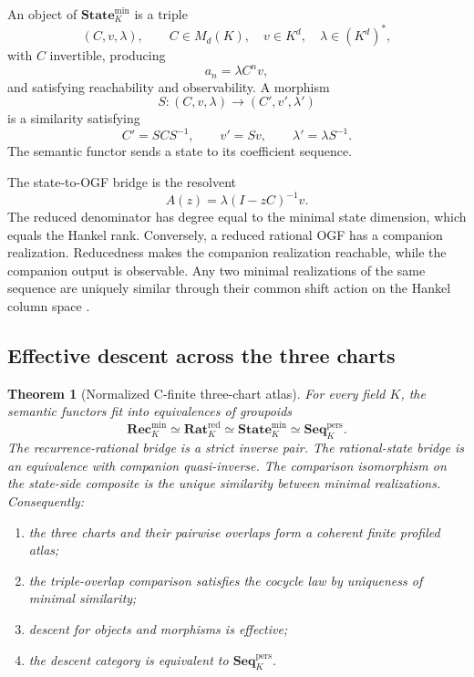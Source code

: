 \documentclass[11pt]{article}
\newtheorem{theorem}{Theorem}[section]
\theoremstyle{definition}
\theoremstyle{remark}
\newcommand{\Seq}{\mathbf{Seq}}
\newcommand{\Rat}{\mathbf{Rat}}
\newcommand{\Rec}{\mathbf{Rec}}
\newcommand{\State}{\mathbf{State}}
\begin{document}
An object of \(\State_K^{\mathrm{min}}\) is a triple
\[
(C,v,\lambda),
\qquad
C\in M_d(K),\quad v\in K^d,\quad \lambda\in(K^d)^*,
\]
with \(C\) invertible, producing
\[
a_n=\lambda C^nv,
\]
and satisfying reachability and observability. A morphism
\[
S:(C,v,\lambda)\longrightarrow(C',v',\lambda')
\]
is a similarity satisfying
\[
C'=SCS^{-1},
\qquad
v'=Sv,
\qquad
\lambda'=\lambda S^{-1}.
\]
The semantic functor sends a state to its coefficient sequence.

The state-to-OGF bridge is the resolvent
\[
A(z)=\lambda(I-zC)^{-1}v.
\]
The reduced denominator has degree equal to the minimal state dimension, which equals the Hankel rank. Conversely, a reduced rational OGF has a companion realization. Reducedness makes the companion realization reachable, while the companion output is observable. Any two minimal realizations of the same sequence are uniquely similar through their common shift action on the Hankel column space \cite{SEQ}.

\subsection{Effective descent across the three charts}

\begin{theorem}[Normalized C-finite three-chart atlas]
\label{thm:cfinite-three-chart}
For every field \(K\), the semantic functors fit into equivalences of groupoids
\[
\Rec_K^{\mathrm{min}}
\simeq
\Rat_K^{\mathrm{red}}
\simeq
\State_K^{\mathrm{min}}
\simeq
\Seq_K^{\mathrm{pers}}.
\]
The recurrence-rational bridge is a strict inverse pair. The rational-state bridge is an equivalence with companion quasi-inverse. The comparison isomorphism on the state-side composite is the unique similarity between minimal realizations. Consequently:

\begin{enumerate}[label=\textup{(\roman*)}]
\item the three charts and their pairwise overlaps form a coherent finite profiled atlas;
\item the triple-overlap comparison satisfies the cocycle law by uniqueness of minimal similarity;
\item descent for objects and morphisms is effective;
\item the descent category is equivalent to \(\Seq_K^{\mathrm{pers}}\).
\end{enumerate}
\end{theorem}
\end{document}

